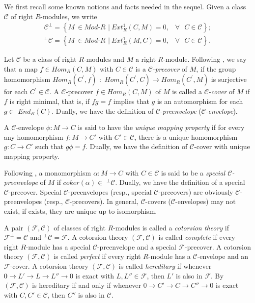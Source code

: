 ﻿\documentclass[
11pt,%
tightenlines,%
twoside,%
onecolumn,%
nofloats,%
nobibnotes,%
nofootinbib,%
superscriptaddress,%
noshowpacs,%
centertags]%
{revtex4}
\begin{document}
 We first recall some known notions and facts needed in the sequel.
Given a class $\mathcal{C}$ of right $R$-modules, we write
\begin{eqnarray*}
\mathcal{C}^{\bot} = \left\{ M \, \in Mod\mbox{-}R \, \ | \ Ext_{R}^{1}(C, M) = 0,\,
\mbox{ $\forall$ } C \in \mathcal{C}\right\};\\
^{\bot}\mathcal{C} = \left\{ M \, \in Mod\mbox{-}R \, \ | \ Ext_{R}^{1}(M, C) = 0,\,
\mbox{ $\forall$ } C \in \mathcal{C}\right\}.
\end{eqnarray*}

Let $\mathcal{C}$ be a class of right $R$-modules and $M$ a right
$R$-module.  Following \cite{Eno}, we say that a map $f \in
Hom_{R}(C, M)$ with $C \in \mathcal{C}$ is a
$\mathcal{C}$-\textit{precover} of $M$, if the group homomorphism
$Hom_{R}(C^\prime, f)$ $\colon$ $Hom_{R}(C^\prime, C) \rightarrow
Hom_{R}(C^\prime, M)$ is surjective for each
$C^\prime\in\mathcal{C}$. A $\mathcal{C}$-precover $f \in Hom_{R}(C,
M)$ of $M$ is called a $\mathcal{C}$-\textit{cover} of $M$ if $f$ is
right minimal, that is, if $fg = f$ implies that $g$ is an
automorphism for each $g \in$ $End_{R}(C)$. Dually, we have the
definition of $\mathcal{C}$-\textit{preenvelope}
($\mathcal{C}$-\textit{envelope}).

A $\mathcal{C}$-envelope $\phi : M \rightarrow C$  is said to have
the \textit{unique mapping property} \cite{Ding} if for every any
homomorphism $f : M \rightarrow C'$ with $C' \in \mathcal{C}$, there
is a unique homomorphism $g : C \rightarrow C'$ such that $g\phi =
f$. Dually, we have the definition of $\mathcal{C}$-cover with
unique mapping property.

Following \cite{Eno}, a monomorphism $\alpha : M \rightarrow C$
with $C \in \mathcal{C}$ is said to be a \textit{special
$\mathcal{C}$-preenvelope} of $M$ if $coker(\alpha) \in$
$^\bot\mathcal{C}$. Dually, we have the definition of a special
$\mathcal{C}$-precover. Special $\mathcal{C}$-preenvelopes (resp.,
special $\mathcal{C}$-precovers) are obviously
$\mathcal{C}$-preenvelopes (resp., $\mathcal{C}$-precovers). In
general, $\mathcal{C}$-covers ($\mathcal{C}$-envelopes) may not
exist, if exists, they are unique up to isomorphism.

A pair $(\mathcal{F}, \mathcal{C})$ of classes of right $R$-modules
is called  a \textit{cotorsion theory} \cite{Eno} if
$\mathcal{F}^{\bot} = \mathcal{C}$ and $^{\bot}\mathcal{C} =
\mathcal{F}$. A cotorsion theory $(\mathcal{F}, \mathcal{C})$ is
called \textit{complete} \cite{Trl} if every right $R$-module has a
special $\mathcal{C}$-preenvelope and a special
$\mathcal{F}$-precover. A cotorsion theory $(\mathcal{F},
\mathcal{C})$ is called \textit{perfect} \cite{Eno-5} if every right
$R$-module has a $\mathcal{C}$-envelope and an $\mathcal{F}$-cover.
A cotorsion theory $(\mathcal{F}, \mathcal{C})$ is called
\textit{hereditary} \cite{Eno-5} if whenever $0 \rightarrow L'
\rightarrow L \rightarrow L'' \rightarrow 0$ is exact with $L, L''
\in \mathcal{F}$, then $L'$ is also in $\mathcal{F}$. By
\cite[Proposition $1.2$]{Eno-5} $(\mathcal{F}, \mathcal{C})$ is
hereditary if and only if whenever $0 \rightarrow C' \rightarrow C
\rightarrow C'' \rightarrow 0$ is exact with $C, C' \in
\mathcal{C}$, then $C''$ is also in $\mathcal{C}$.
\end{document}
